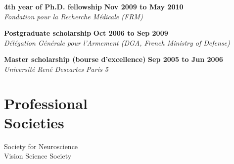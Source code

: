 \documentclass[margin,line]{resume}
\begin{document}
\begin{resume}
	\textbf{4th year of Ph.D. fellowship} \hfill \textbf{Nov 2009 to May 2010}\\
	\textsl{Fondation pour la Recherche Médicale (FRM)}

	\newpage	
	
	\textbf{Postgraduate scholarship} \hfill \textbf{Oct 2006 to Sep 2009}\\ %
	\textsl{Délégation Générale pour l'Armement (DGA, French Ministry of Defense)}

	\textbf{Master scholarship (bourse d’excellence)} \hfill \textbf{Sep 2005 to Jun 2006}\\
	\textsl{Université René Descartes Paris 5}


%
%
%

	
	\vspace{3mm}
	\section{\mysidestyle Professional\\Societies}
	Society for Neuroscience\\
	Vision Science Society
	



\end{resume}
\end{document}
